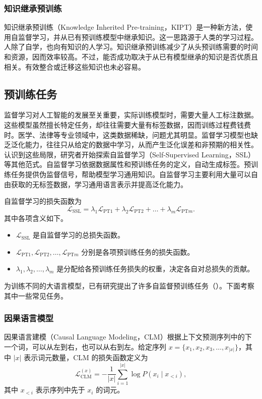 \subsubsection{知识继承预训练}
知识继承预训练（Knowledge Inherited Pre-training，KIPT）是一种新方法，使用自监督学习，并从已有预训练模型中继承知识。这一思路源于人类的学习过程。人除了自学，也向有知识的人学习。知识继承预训练减少了从头预训练需要的时间和资源，因而效率较高。不过，能否成功取决于从已有模型继承的知识是否优质且相关。有效整合或迁移这些知识也未必容易。

\subsection{预训练任务}
监督学习对人工智能的发展至关重要，实际训练模型时，需要大量人工标注数据。这些模型虽然擅长特定任务，却往往需要大量有标签数据，因而训练过程费钱费时。医学、法律等专业领域中，这类数据稀缺，问题尤其明显。监督学习模型也缺乏泛化能力，往往只从给定的数据中学习，从而产生泛化误差和非预期的相关性。认识到这些局限，研究者开始探索自监督学习（Self-Supervised Learning，SSL）等其他范式。自监督学习依据数据属性和预训练任务的定义，自动生成标签。预训练任务提供伪监督信号，帮助模型学习通用知识。自监督学习主要利用大量可以自由获取的无标签数据，学习通用语言表示并提高泛化能力。

自监督学习的损失函数为
\begin{equation}
\mathcal{L}_{\mathrm{SSL}}=
\lambda_1\mathcal{L}_{\mathrm{PT}1}+
\lambda_2\mathcal{L}_{\mathrm{PT}2}+\ldots+
\lambda_m\mathcal{L}_{\mathrm{PT}m}.
\tag{2.20}
\end{equation}
其中各项含义如下。
\begin{itemize}
\item $\mathcal{L}_{\mathrm{SSL}}$ 是自监督学习的总损失函数。
\item $\mathcal{L}_{\mathrm{PT}1},\mathcal{L}_{\mathrm{PT}2},\ldots,\mathcal{L}_{\mathrm{PT}m}$ 分别是各项预训练任务的损失函数。
\item $\lambda_1,\lambda_2,\ldots,\lambda_m$ 是分配给各预训练任务损失的权重，决定各自对总损失的贡献。
\end{itemize}
为训练不同的大语言模型，已有研究提出了许多自监督预训练任务（）。下面考察其中一些常见任务。

\subsubsection{因果语言模型}
因果语言建模（Causal Language Modeling，CLM）根据上下文预测序列中的下一个词，可以从左到右，也可以从右到左。给定序列 $x=\{x_1,x_2,x_3,\ldots,x_{|x|}\}$，其中 $|x|$ 表示词元数量，CLM 的损失函数定义为
\begin{equation}
\mathcal{L}_{\mathrm{CLM}}^{(x)}=-\frac{1}{|x|}\sum_{i=1}^{|x|}\log P(x_i\mid x_{<i}),
\tag{2.21}
\end{equation}
其中 $x_{<i}$ 表示序列中先于 $x_i$ 的词元。

